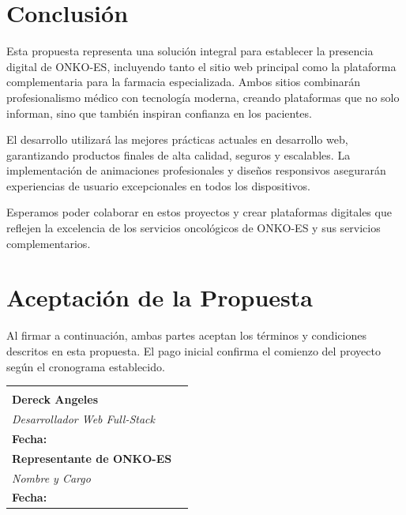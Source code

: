 \documentclass[12pt,a4paper]{article}
\begin{document}
\section{Conclusión}

Esta propuesta representa una solución integral para establecer la presencia digital de ONKO-ES, incluyendo tanto el sitio web principal como la plataforma complementaria para la farmacia especializada. Ambos sitios combinarán profesionalismo médico con tecnología moderna, creando plataformas que no solo informan, sino que también inspiran confianza en los pacientes.

El desarrollo utilizará las mejores prácticas actuales en desarrollo web, garantizando productos finales de alta calidad, seguros y escalables. La implementación de animaciones profesionales y diseños responsivos asegurarán experiencias de usuario excepcionales en todos los dispositivos.

Esperamos poder colaborar en estos proyectos y crear plataformas digitales que reflejen la excelencia de los servicios oncológicos de ONKO-ES y sus servicios complementarios.

\section{Aceptación de la Propuesta}

Al firmar a continuación, ambas partes aceptan los términos y condiciones descritos en esta propuesta. El pago inicial confirma el comienzo del proyecto según el cronograma establecido.

\vspace{3cm}

\begin{tabularx}{\textwidth}{X X}
    \begin{center}
        \hrulefill \\
        \vspace{0.2cm}
        \textbf{Dereck Angeles} \\
        \textit{Desarrollador Web Full-Stack} \\[1.5cm]
        \textbf{Fecha:} \underline{\hspace{4cm}}
    \end{center} &
    \begin{center}
        \hrulefill \\
        \vspace{0.2cm}
        \textbf{Representante de ONKO-ES} \\
        \textit{Nombre y Cargo} \\[1.5cm]
        \textbf{Fecha:} \underline{\hspace{4cm}}
    \end{center} \\
\end{tabularx}
\end{document}
